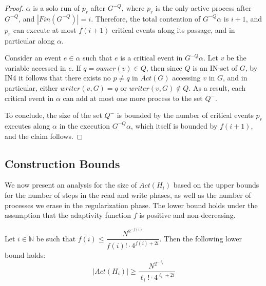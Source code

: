 \begin{proof}
	$\alpha$ is a solo run of $p_r$ after $G^{-Q}$, where $p_r$ is the only active process after $G^{-Q}$, and $|Fin(G^{-Q})| = i$. Therefore, the total contention of $G^{-Q} \alpha$ is $i+1$, and $p_r$ can execute at most $f(i+1)$ critical events along its passage, and in particular along $\alpha$.
	
	Consider an event $e \in \alpha$ such that $e$ is a critical event in $G^{-Q} \alpha$. Let $v$ be the variable accessed in $e$. If $q = owner(v) \in Q$, then since $Q$ is an IN-set of $G$, by IN4 it follows that there exists no $p \neq q$ in $Act(G)$ accessing $v$ in $G$, and in particular, either $writer(v,G) = q$ or $writer(v,G) \notin Q$. As a result, each critical event in $\alpha$ can add at most one more process to the set $Q^-$.
	
	To conclude, the size of the set $Q^-$ is bounded by the number of critical events $p_r$ executes along $\alpha$ in the execution $G^{-Q} \alpha$, which itself is bounded by $f(i+1)$, and the claim follows.
\end{proof}









\newpage
\subsection{Construction Bounds}
We now present an analysis for the size of $Act(H_i)$ based on the upper bounds for the number of steps in the read and write phases, as well as the number of processes we erase in the regularization phase. The lower bound holds under the assumption that the adaptivity function $f$ is positive and non-decreasing.

\begin{theorem} \label{theorem: Act-lower-bound}
	Let $i \in \mathbb{N}$ be such that $f(i) \leq \dfrac{N^{2^{-f(i)}}} {f(i)! \cdot 4^{f(i)+2i}}$. Then the following lower bound holds:
	$$|Act(H_i)| \geq \frac{N^{2^{-\ell_i}}}{\ell_i! \cdot 4^{\ell_i+2i}}$$
\end{theorem}

